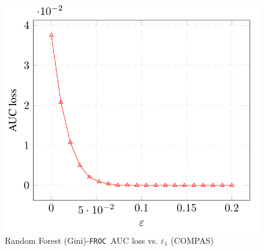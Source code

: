 \documentclass{article}
\newcommand{\ouralgo}{\texttt{FROC}}
\begin{document}
\begin{figure}[!h]
    \centering
    \includegraphics[width=1\linewidth]{Images/RFG_COMPAS_AUC.png}
    \caption{Random Forest (Gini)-\ouralgo\ AUC loss vs. $\varepsilon_1$ (COMPAS)}
    \label{fig:RFG_COMPAS_AUC}
\end{figure}







        
\end{document}
